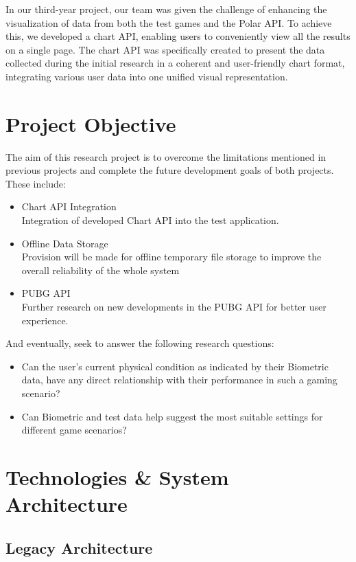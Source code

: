 \documentclass{report}
\begin{document}
\par
In our third-year project, our team was given the challenge of enhancing the visualization of data from both the test games and the Polar API. To achieve this, we developed a chart API, enabling users to conveniently view all the results on a single page. The chart API was specifically created to present the data collected during the initial research in a coherent and user-friendly chart format, integrating various user data into one unified visual representation.

\section*{Project Objective}
The aim of this research project is to overcome the limitations mentioned in previous projects and complete the future development goals of both projects.
These include:

\begin{itemize}
\item {Chart API Integration}\\
Integration of developed Chart API into the test application.
\item {Offline Data Storage}\\
Provision will be made for offline temporary file storage to improve the overall reliability of the whole system
\item{PUBG API}\\
Further research on new developments in the PUBG API for better user experience. 
\end{itemize} 
        
And eventually, seek to answer the following research questions:
\begin{itemize}
\item {Can the user's current physical condition as indicated by their Biometric data, have any direct relationship with their performance in such a gaming scenario?}
\item {Can Biometric and test data help suggest the most suitable settings for different game scenarios?}
\end{itemize}

\section*{Technologies \& System Architecture}
\subsection*{Legacy Architecture}
\end{document}
